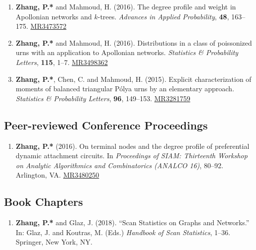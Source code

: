 \documentclass[margin]{res}
\def\MR#1{\href{http://www.ams.org/mathscinet-getitem?mr=#1}{MR#1}}
\begin{document}
\begin{resume}
\begin{enumerate}
{	Communications in Statistics---Theory and Methods}, \textbf{48}, 
	5308--5321. \MR{4007715}
	\item {\sc \bf Zhang, P.*} and {\sc Mahmoud, H.} (2016). The degree profile and weight in Apollonian networks and $k$-trees. \emph{Advances in Applied Probability}, \textbf{48}, 163--175. \MR{3473572}
	\item {\sc \bf Zhang, P.*} and {\sc Mahmoud, H.} (2016). Distributions in a class of poissonized urns with an application to Apollonian networks. \emph{Statistics \& Probability Letters}, {\bf 115}, 1--7. \MR{3498362}
	\item {\sc \bf Zhang, P.*}, {\sc Chen, C.} and {\sc Mahmoud, H.} (2015). Explicit characterization of moments of balanced triangular P\'{o}lya urns by an elementary approach. \emph{Statistics \& Probability Letters}, {\bf 96}, 149--153. \MR{3281759}
\end{enumerate} 

\subsection{Peer-reviewed Conference Proceedings}
\begin{enumerate}
	\item {\sc \bf Zhang, P.*} (2016). On terminal nodes and the degree profile of preferential dynamic attachment circuits. In \emph{Proceedings of SIAM: Thirteenth Workshop on Analytic Algorithmics and Combinatorics (ANALCO 16)}, 80--92. Arlington, VA. \MR{3480250}
\end{enumerate}

\subsection{Book Chapters}
\begin{enumerate}
	\item {\sc \bf Zhang, P.*} and {\sc Glaz, J.} (2018). ``Scan 
	Statistics on Graphs and Networks.'' In: Glaz, J. and Koutras, 
	M. (Eds.) {\em Handbook of Scan Statistics}, 1--36. Springer, 
	New York, NY. 
\end{enumerate}


\end{resume}
\end{document}
